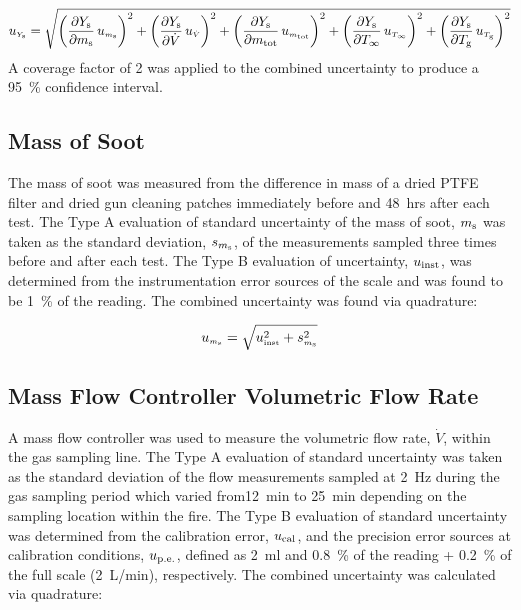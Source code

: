 \documentclass[12pt]{article}
\begin{document}
\begin{equation}
\label{eq:soot_mass_frac_uncertainty}
u_{\scriptscriptstyle Y_{\rm s}} = \sqrt{{\left(\frac{\partial Y_{\rm s}}{\partial m_{\rm s}}\,u_{\scriptscriptstyle m_{\rm s}} \right)}^2+{\left(\frac{\partial Y_{\rm s}}{\partial \dot{V} }\,u_{\scriptscriptstyle \dot{V}} \right)}^2+{\left(\frac{\partial Y_{\rm s}}{\partial m_{\rm tot}}\,u_{\scriptscriptstyle m_{\rm tot}} \right)}^2+{\left(\frac{\partial Y_{\rm s}}{\partial T_{\rm \infty}}\,u_{\scriptscriptstyle T_{\rm \infty}} \right)}^2+{\left(\frac{\partial Y_{\rm s}}{\partial T_{\rm g}}\,u_{\scriptscriptstyle T_{\rm g}} \right)}^2}
\end{equation}
A coverage factor of 2 was applied to the combined uncertainty to produce a 95~\% confidence interval.

\subsection{Mass of Soot}
\label{ssec:Mass_of_Soot}

The mass of soot was measured from the difference in mass of a dried PTFE filter and dried gun cleaning patches immediately before and \SI{48}{hrs} after each test. The Type A evaluation of standard uncertainty of the mass of soot, $m_{\rm s}$ was taken as the standard deviation, $s_{m_{\rm s}}$, of the measurements sampled three times before and after each test. The Type B evaluation of uncertainty, $u_{\rm inst}$, was determined from the instrumentation error sources of the scale and was found to be 1~\% of the reading. The combined uncertainty was found via quadrature:

\begin{equation}
\label{eq:soot_mass_uncertainty}
u_{\scriptscriptstyle m_{\rm s}} = \sqrt{u_{\rm \scriptscriptstyle inst}^2 + s_{\scriptscriptstyle m_{\rm s}}^2}
\end{equation}

\subsection{Mass Flow Controller Volumetric Flow Rate}
\label{ssec:Mass_Flow_Controller_Volumetric_Flow_Rate}

A mass flow controller was used to measure the volumetric flow rate, $\dot{V}$, within the gas sampling line. The Type A evaluation of standard uncertainty was taken as the standard deviation of the flow measurements sampled at \SI{2}{Hz} during the gas sampling period which varied from\SI{12}{min} to \SI{25}{min} depending on the sampling location within the fire. The Type B evaluation of standard uncertainty was determined from the calibration error, $u_{\rm cal}$, and the precision error sources at calibration conditions, $u_{\rm p.e.}$, defined as \SI{2}{ml} and 0.8~\% of the reading + 0.2~\% of the full scale (\SI{2}{L/min}), respectively. The combined uncertainty was calculated via quadrature:
\end{document}
